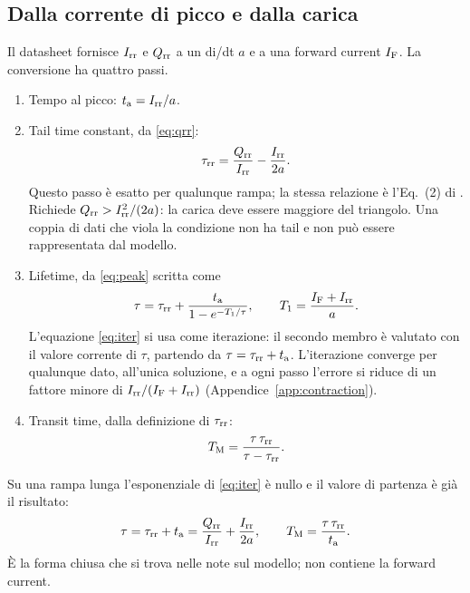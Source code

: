 \documentclass[10pt,a4paper]{scrartcl}
\let\newcommand\lmitdefine
\newcommand{\IF}{I_\mathrm{F}}
\newcommand{\Irr}{I_\mathrm{rr}}
\newcommand{\Qrr}{Q_\mathrm{rr}}
\newcommand{\ta}{t_\mathrm{a}}
\newcommand{\taurr}{\tau_\mathrm{rr}}
\newcommand{\TM}{T_\mathrm{M}}
\newcommand{\Tone}{T_1}
\begin{document}
\subsection{Dalla corrente di picco e dalla carica}
\label{sec:invpq}
Il datasheet fornisce $\Irr$ e $\Qrr$ a un di/dt $a$ e a una forward current $\IF$. La conversione ha quattro passi.
\begin{enumerate}
\item Tempo al picco: $\ta = \Irr/a$.
\item Tail time constant, da \eqref{eq:qrr}:
\begin{equation}
\taurr = \frac{\Qrr}{\Irr} - \frac{\Irr}{2a} .
\label{eq:taurr}
\end{equation}
Questo passo è esatto per qualunque rampa; la stessa relazione è l'Eq.~(2) di \cite{an6481}. Richiede $\Qrr > \Irr^2/(2a)$: la carica deve essere maggiore del triangolo. Una coppia di dati che viola la condizione non ha tail e non può essere rappresentata dal modello.
\item Lifetime, da \eqref{eq:peak} scritta come
\begin{equation}
\tau = \taurr + \frac{\ta}{1 - e^{-\Tone/\tau}} , \qquad \Tone = \frac{\IF+\Irr}{a} .
\label{eq:iter}
\end{equation}
L'equazione \eqref{eq:iter} si usa come iterazione: il secondo membro è valutato con il valore corrente di $\tau$, partendo da $\tau = \taurr + \ta$. L'iterazione converge per qualunque dato, all'unica soluzione, e a ogni passo l'errore si riduce di un fattore minore di $\Irr/(\IF+\Irr)$ (Appendice~\ref{app:contraction}).
\item Transit time, dalla definizione di $\taurr$:
\begin{equation}
\TM = \frac{\tau\,\taurr}{\tau - \taurr} .
\label{eq:tm}
\end{equation}
\end{enumerate}
Su una rampa lunga l'esponenziale di \eqref{eq:iter} è nullo e il valore di partenza è già il risultato:
\begin{equation}
\tau = \taurr + \ta = \frac{\Qrr}{\Irr} + \frac{\Irr}{2a} , \qquad \TM = \frac{\tau\,\taurr}{\ta} .
\label{eq:longinv}
\end{equation}
È la forma chiusa che si trova nelle note sul modello; non contiene la forward current.
\end{document}

